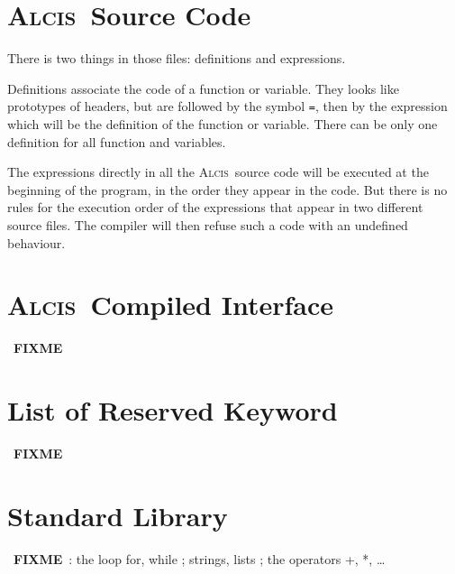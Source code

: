 \documentclass{article}
\newcommand{\Alcis}{\textsc{Alcis}~}
\newcommand{\FIXME}{~\textbf{FIXME}~}
\begin{document}
\section{\Alcis Source Code}

There is two things in those files: definitions and expressions.

Definitions associate the code of a function or variable.
They looks like prototypes of headers, but are followed by the symbol \lstinline$=$, then by the expression which will be the definition of the function or variable.
There can be only one definition for all function and variables.

The expressions directly in all the \Alcis source code will be executed at the beginning of the program, in the order they appear in the code.
But there is no rules for the execution order of the expressions that appear in two different source files.
The compiler will then refuse such a code with an undefined behaviour.

\section{\Alcis Compiled Interface}

\FIXME

\section{List of Reserved Keyword}

\FIXME

\section{Standard Library}

\FIXME: the loop for, while ; strings, lists ; the operators +, *, \ldots
\end{document}
